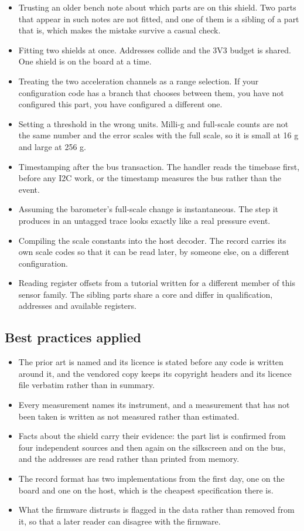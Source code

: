\begin{itemize}
\item Trusting an older bench note about which parts are on this shield. Two
parts that appear in such notes are not fitted, and one of them is a sibling of
a part that is, which makes the mistake survive a casual check.
\item Fitting two shields at once. Addresses collide and the 3V3 budget is
shared. One shield is on the board at a time.
\item Treating the two acceleration channels as a range selection. If your
configuration code has a branch that chooses between them, you have not
configured this part, you have configured a different one.
\item Setting a threshold in the wrong units. Milli-g and full-scale counts are
not the same number and the error scales with the full scale, so it is small at
16 g and large at 256 g.
\item Timestamping after the bus transaction. The handler reads the timebase
first, before any I2C work, or the timestamp measures the bus rather than the
event.
\item Assuming the barometer's full-scale change is instantaneous. The step it
produces in an untagged trace looks exactly like a real pressure event.
\item Compiling the scale constants into the host decoder. The record carries
its own scale codes so that it can be read later, by someone else, on a
different configuration.
\item Reading register offsets from a tutorial written for a different member of
this sensor family. The sibling parts share a core and differ in qualification,
addresses and available registers.
\end{itemize}

\subsection*{Best practices applied}

\begin{itemize}
\item The prior art is named and its licence is stated before any code is
written around it, and the vendored copy keeps its copyright headers and its
licence file verbatim rather than in summary.
\item Every measurement names its instrument, and a measurement that has not
been taken is written as not measured rather than estimated.
\item Facts about the shield carry their evidence: the part list is confirmed
from four independent sources and then again on the silkscreen and on the bus,
and the addresses are read rather than printed from memory.
\item The record format has two implementations from the first day, one on the
board and one on the host, which is the cheapest specification there is.
\item What the firmware distrusts is flagged in the data rather than removed
from it, so that a later reader can disagree with the firmware.
\end{itemize}

